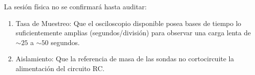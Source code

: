 \documentclass[11pt, a4paper]{article}
\begin{document}
\vspace{0.8cm}
\begin{tcolorbox}[colback=gray!5, colframe=black, title=\textbf{Protocolo de Validación de Viabilidad}]
La sesión física no se confirmará hasta auditar:
\begin{enumerate}
    \item Tasa de Muestreo: Que el osciloscopio disponible posea bases de tiempo lo suficientemente amplias (segundos/división) para observar una carga lenta de $\sim 25$ a $\sim 50$ segundos.
    \item Aislamiento: Que la referencia de masa de las sondas no cortocircuite la alimentación del circuito RC.
\end{enumerate}
\end{tcolorbox}
\end{document}
